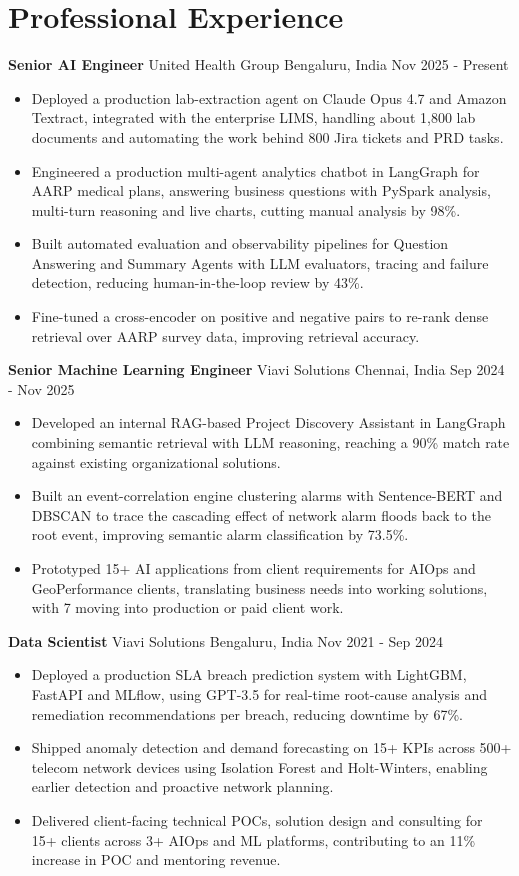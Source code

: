 \documentclass[10pt,a4paper]{article}
\newcommand{\role}[4]{\textbf{#1} \textbar{} #2 \hfill #3 \textbar{} #4\par}
\begin{document}
\section{Professional Experience}
\role{Senior AI Engineer}{United Health Group}{Bengaluru, India}{Nov 2025 - Present}
\begin{itemize}
  \item Deployed a production lab-extraction agent on Claude Opus 4.7 and Amazon Textract, integrated with the enterprise LIMS, handling about 1,800 lab documents and automating the work behind 800 Jira tickets and PRD tasks.
  \item Engineered a production multi-agent analytics chatbot in LangGraph for AARP medical plans, answering business questions with PySpark analysis, multi-turn reasoning and live charts, cutting manual analysis by 98\%.
  \item Built automated evaluation and observability pipelines for Question Answering and Summary Agents with LLM evaluators, tracing and failure detection, reducing human-in-the-loop review by 43\%.
  \item Fine-tuned a cross-encoder on positive and negative pairs to re-rank dense retrieval over AARP survey data, improving retrieval accuracy.
\end{itemize}
\vspace{3pt}
\role{Senior Machine Learning Engineer}{Viavi Solutions}{Chennai, India}{Sep 2024 - Nov 2025}
\begin{itemize}
  \item Developed an internal RAG-based Project Discovery Assistant in LangGraph combining semantic retrieval with LLM reasoning, reaching a 90\% match rate against existing organizational solutions.
  \item Built an event-correlation engine clustering alarms with Sentence-BERT and DBSCAN to trace the cascading effect of network alarm floods back to the root event, improving semantic alarm classification by 73.5\%.
  \item Prototyped 15+ AI applications from client requirements for AIOps and GeoPerformance clients, translating business needs into working solutions, with 7 moving into production or paid client work.
\end{itemize}
\vspace{3pt}
\role{Data Scientist}{Viavi Solutions}{Bengaluru, India}{Nov 2021 - Sep 2024}
\begin{itemize}
  \item Deployed a production SLA breach prediction system with LightGBM, FastAPI and MLflow, using GPT-3.5 for real-time root-cause analysis and remediation recommendations per breach, reducing downtime by 67\%.
  \item Shipped anomaly detection and demand forecasting on 15+ KPIs across 500+ telecom network devices using Isolation Forest and Holt-Winters, enabling earlier detection and proactive network planning.
  \item Delivered client-facing technical POCs, solution design and consulting for 15+ clients across 3+ AIOps and ML platforms, contributing to an 11\% increase in POC and mentoring revenue.
\end{itemize}
\end{document}
